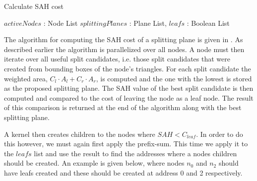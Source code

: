 \begin{algorithm}
  \caption{Calculate SAH cost}
  \label{alg:calcSAHCost}
  \begin{algorithmic}
              {$activeNodes$ : Node List}
              {$splittingPlanes$ : Plane List, $leafs$ : Boolean List}{
                  \ENDFOR
                \ENDFOR
              }
  \end{algorithmic}
\end{algorithm}


The algorithm for computing the SAH cost of a splitting plane is given in
. As described earlier the algorithm is parallelized
over all nodes. A node must then iterate over all useful split candidates,
i.e. those split candidates that were created from bounding boxes of the node's
triangles. For each split candidate the weighted area, $C_l \cdot A_l + C_r
\cdot A_r$, is computed and the one with the lowest is stored as the proposed
splitting plane. The SAH value of the best split candidate is then computed and
compared to the cost of leaving the node as a leaf node. The result of this
comparison is returned at the end of the algorithm along with the best splitting
plane.


A kernel then creates children to the nodes where $SAH < C_{leaf}$. In order to
do this however, we must again first apply the prefix-sum. This time we apply it
to the $leafs$ list and use the result to find the addresses where a nodes
children should be created. An example is given below, where nodes $n_0$ and
$n_2$ should have leafs created and these should be created at address 0 and 2
respectively.

